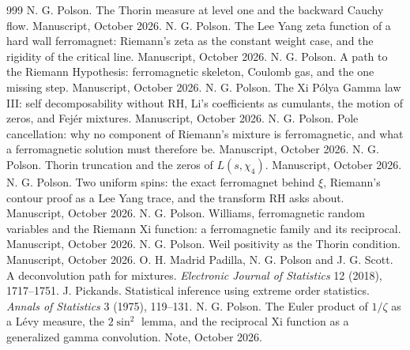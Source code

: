 \begin{thebibliography}{999}
 N. G. Polson. The Thorin measure at level one and the backward Cauchy flow. Manuscript, October 2026.
 N. G. Polson. The Lee Yang zeta function of a hard wall ferromagnet: Riemann's zeta as the constant weight case, and the rigidity of the critical line. Manuscript, October 2026.
 N. G. Polson. A path to the Riemann Hypothesis: ferromagnetic skeleton, Coulomb gas, and the one missing step. Manuscript, October 2026.
 N. G. Polson. The Xi P\'olya Gamma law III: self decomposability without RH, Li's coefficients as cumulants, the motion of zeros, and Fej\'er mixtures. Manuscript, October 2026.
 N. G. Polson. Pole cancellation: why no component of Riemann's mixture is ferromagnetic, and what a ferromagnetic solution must therefore be. Manuscript, October 2026.
 N. G. Polson. Thorin truncation and the zeros of $L(s,\chi_4)$. Manuscript, October 2026.
 N. G. Polson. Two uniform spins: the exact ferromagnet behind $\xi$, Riemann's contour proof as a Lee Yang trace, and the transform RH asks about. Manuscript, October 2026.
 N. G. Polson. Williams, ferromagnetic random variables and the Riemann Xi function: a ferromagnetic family and its reciprocal. Manuscript, October 2026.
 N. G. Polson. Weil positivity as the Thorin condition. Manuscript, October 2026.
 O. H. Madrid Padilla, N. G. Polson and J. G. Scott. A deconvolution path for mixtures. \emph{Electronic Journal of Statistics} 12 (2018), 1717--1751.
 J. Pickands. Statistical inference using extreme order statistics. \emph{Annals of Statistics} 3 (1975), 119--131.
 N. G. Polson. The Euler product of $1/\zeta$ as a L\'evy measure, the $2\sin^2$ lemma, and the reciprocal Xi function as a generalized gamma convolution. Note, October 2026.

\end{thebibliography}
